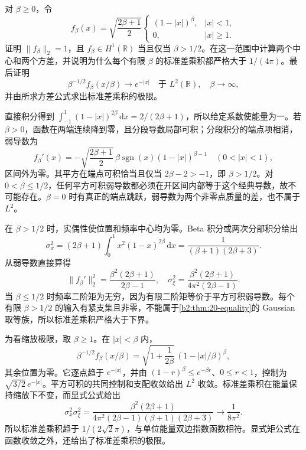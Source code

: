\begin{optionalexercise}\label{b2:ex:20-new-3}
对 \(\beta\geq0\)，令
\[
 f_\beta(x)=\sqrt{\frac{2\beta+1}{2}}
 \begin{cases}
 (1-|x|)^\beta,& |x|<1,\\
 0,& |x|\geq1.
 \end{cases}
\]
证明 \(\|f_\beta\|_2=1\)，且 \(f_\beta\in H^1(\mathbb R)\) 当且仅当 \(\beta>1/2\)。在这一范围中计算两个中心和两个方差，并说明为什么每个有限 \(\beta\) 的标准差乘积都严格大于 \(1/(4\pi)\)。最后证明
\[
 \beta^{-1/2}f_\beta(x/\beta)\longrightarrow e^{-|x|}
 \quad\text{于 }L^2(\mathbb R),\quad\beta\longrightarrow\infty,
\]
并由所求方差公式求出标准差乘积的极限。
\end{optionalexercise}
\begin{solution}
直接积分得到 \(\int_{-1}^1(1-|x|)^{2\beta}\,\mathrm dx=2/(2\beta+1)\)，所以给定系数使能量为一。若 \(\beta>0\)，函数在两端连续降到零，且分段导数局部可积；分段积分的端点项相消，弱导数为
\[
 f_\beta'(x)=-\sqrt{\frac{2\beta+1}{2}}\,
  \beta\operatorname{sgn}(x)(1-|x|)^{\beta-1}
 \quad(0<|x|<1),
\]
区间外为零。其平方在端点可积恰当且仅当
\(2\beta-2>-1\)，即 \(\beta>1/2\)。对 \(0<\beta\leq1/2\)，任何平方可积弱导数都必须在开区间内部等于这个经典导数，故不可能存在。\(\beta=0\) 时有真正的端点跳跃，弱导数为两个非零点质量的差，也不属于 \(L^2\)。

在 \(\beta>1/2\) 时，实偶性使位置和频率中心均为零。Beta 积分或两次分部积分给出
\[
 \sigma_x^2
 =(2\beta+1)\int_0^1x^2(1-x)^{2\beta}\,\mathrm dx
 =\frac1{(\beta+1)(2\beta+3)}.
\]
从弱导数直接算得
\[
 \|f_\beta'\|_2^2
 =\frac{\beta^2(2\beta+1)}{2\beta-1},
 \quad
 \sigma_\xi^2
 =\frac{\beta^2(2\beta+1)}{4\pi^2(2\beta-1)}.
\]
当 \(\beta\leq1/2\) 时频率二阶矩为无穷，因为有限二阶矩等价于平方可积弱导数。每个有限 \(\beta>1/2\) 的输入有紧支集且非零，不能属于\cref{b2:thm:20-equality}的 Gaussian 取等族，所以标准差乘积严格大于下界。

为看缩放极限，取 \(\beta\geq1\)。在 \(|x|<\beta\) 内，
\[
 \beta^{-1/2}f_\beta(x/\beta)
 =\sqrt{1+\frac1{2\beta}}\,
              (1-|x|/\beta)^\beta,
\]
其余位置为零。它逐点趋于 \(e^{-|x|}\)，并由
\((1-r)^\beta\leq e^{-\beta r}\)、\(0\leq r<1\)，控制为 \(\sqrt{3/2}\,e^{-|x|}\)。平方可积的共同控制和支配收敛给出 \(L^2\) 收敛。标准差乘积在能量保持缩放下不变，而显式公式给出
\[
 \sigma_x^2\sigma_\xi^2
 =\frac{\beta^2(2\beta+1)}
 {4\pi^2(2\beta-1)(\beta+1)(2\beta+3)}
 \longrightarrow\frac1{8\pi^2}.
\]
所以标准差乘积趋于 \(1/(2\sqrt2\pi)\)，与单位能量双边指数函数相符。显式矩公式在函数收敛之外，还给出了标准差乘积的极限。
\end{solution}

